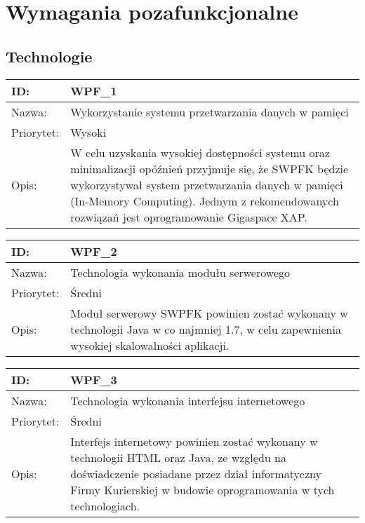 \section{Wymagania pozafunkcjonalne}

\subsection{Technologie}
\begin{center}
\begin{tabular}[h]{|p{1.6cm}|p{13.5cm}|}
\hline
ID: & WPF\_1 \\ \hline
Nazwa: & Wykorzystanie systemu przetwarzania danych w pamięci \\ \hline
Priorytet: & Wysoki \\ \hline
Opis: & W celu uzyskania wysokiej dostępności systemu oraz minimalizacji opóźnień przyjmuje się, że SWPFK będzie wykorzystywał system przetwarzania danych w pamięci (In-Memory Computing). Jednym z rekomendowanych rozwiązań jest oprogramowanie Gigaspace XAP. \\
\hline
\end{tabular}
\end{center}

\begin{center}
\begin{tabular}[h]{|p{1.6cm}|p{13.5cm}|}
\hline
ID: & WPF\_2 \\ \hline
Nazwa: & Technologia wykonania modułu serwerowego \\ \hline
Priorytet: & Średni \\ \hline
Opis: & Moduł serwerowy SWPFK powinien zostać wykonany w technologii Java w co najmniej 1.7, w celu zapewnienia wysokiej skalowalności aplikacji. \\
\hline
\end{tabular}
\end{center}

\begin{center}
\begin{tabular}[h]{|p{1.6cm}|p{13.5cm}|}
\hline
ID: & WPF\_3 \\ \hline
Nazwa: & Technologia wykonania interfejsu internetowego \\ \hline
Priorytet: & Średni \\ \hline
Opis: & Interfejs internetowy powinien zostać wykonany w technologii HTML oraz Java, ze względu na doświadczenie posiadane przez dział informatyczny Firmy Kurierskiej w budowie oprogramowania w tych technologiach. \\
\hline
\end{tabular}
\end{center}

